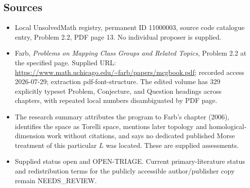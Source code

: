\documentclass[11pt]{article}
\begin{document}
\subsection{Sources}
\begin{itemize}
\item Local UnsolvedMath registry, permanent ID 11000003, source code catalogue entry, Problem 2.2, PDF page 13. No individual proposer is supplied.
\item Farb, \emph{Problems on Mapping Class Groups and Related Topics}, Problem 2.2 at the specified page. Supplied URL: \url{https://www.math.uchicago.edu/~farb/papers/mcgbook.pdf}; recorded access 2026-07-29; extraction pdf-font-structure. The edited volume has 329 explicitly typeset Problem, Conjecture, and Question headings across chapters, with repeated local numbers disambiguated by PDF page.
\item The research summary attributes the program to Farb's chapter (2006), identifies the space as Torelli space, mentions later topology and homological-dimension work without citations, and says no dedicated published Morse treatment of this particular \(L\) was located. These are supplied assessments.
\item Supplied status open and OPEN-TRIAGE. Current primary-literature status and redistribution terms for the publicly accessible author/publisher copy remain NEEDS\_REVIEW.
\end{itemize}
\end{document}
